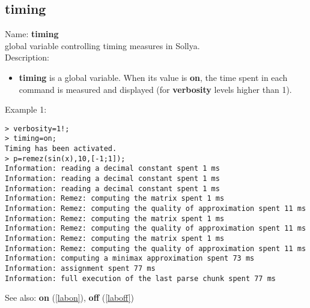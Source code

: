 \subsection{timing}
\label{labtiming}
\noindent Name: \textbf{timing}\\
global variable controlling timing measures in Sollya.\\

\noindent Description: \begin{itemize}

\item \textbf{timing} is a global variable. When its value is \textbf{on}, the time spent in each 
   command is measured and displayed (for \textbf{verbosity} levels higher than 1).
\end{itemize}
\noindent Example 1: 
\begin{center}\begin{minipage}{15cm}\begin{Verbatim}[frame=single]
> verbosity=1!;
> timing=on;
Timing has been activated.
> p=remez(sin(x),10,[-1;1]);
Information: reading a decimal constant spent 1 ms
Information: reading a decimal constant spent 1 ms
Information: reading a decimal constant spent 1 ms
Information: Remez: computing the matrix spent 1 ms
Information: Remez: computing the quality of approximation spent 11 ms
Information: Remez: computing the matrix spent 1 ms
Information: Remez: computing the quality of approximation spent 11 ms
Information: Remez: computing the matrix spent 1 ms
Information: Remez: computing the quality of approximation spent 11 ms
Information: computing a minimax approximation spent 73 ms
Information: assignment spent 77 ms
Information: full execution of the last parse chunk spent 77 ms
\end{Verbatim}
\end{minipage}\end{center}
See also: \textbf{on} (\ref{labon}), \textbf{off} (\ref{laboff})
